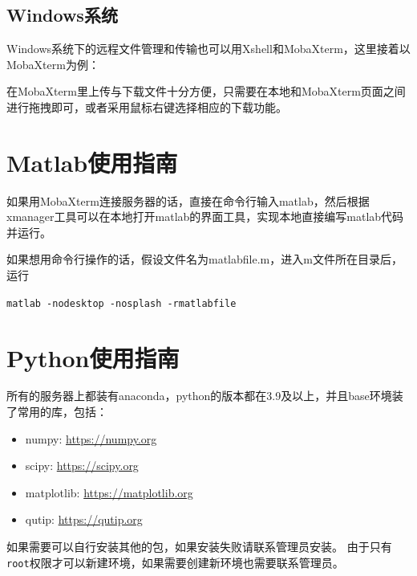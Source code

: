 \documentclass{article}
\begin{document}
\subsection{Windows系统}
Windows系统下的远程文件管理和传输也可以用Xshell和MobaXterm，这里接着以MobaXterm为例：

在MobaXterm里上传与下载文件十分方便，只需要在本地和MobaXterm页面之间进行拖拽即可，或者采用鼠标右键选择相应的下载功能。

\section{Matlab使用指南}
如果用MobaXterm连接服务器的话，直接在命令行输入matlab，然后根据xmanager工具可以在本地打开matlab的界面工具，实现本地直接编写matlab代码并运行。

如果想用命令行操作的话，假设文件名为matlabfile.m，进入m文件所在目录后，运行

\verb|matlab -nodesktop -nosplash -rmatlabfile|
\section{Python使用指南}
所有的服务器上都装有anaconda，python的版本都在3.9及以上，并且base环境装了常用的库，包括：
\begin{itemize}
    \item numpy: \url{https://numpy.org}
    \item scipy: \url{https://scipy.org}
    \item matplotlib: \url{https://matplotlib.org}
    \item qutip: \url{https://qutip.org}
\end{itemize}
如果需要可以自行安装其他的包，如果安装失败请联系管理员安装。
由于只有\verb|root|权限才可以新建环境，如果需要创建新环境也需要联系管理员。
\end{document}
